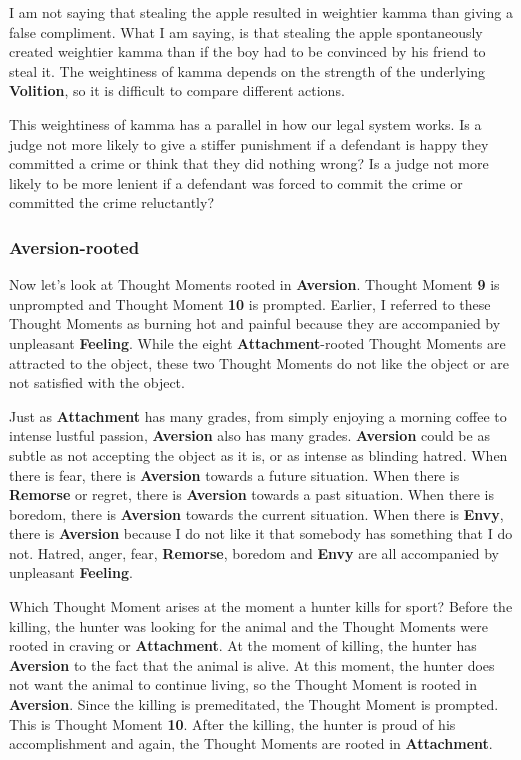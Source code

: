 I am not saying that stealing the apple resulted in weightier kamma than giving a false compliment. What I am saying, is that stealing the apple spontaneously created weightier kamma than if the boy had to be convinced by his friend to steal it. The weightiness of kamma depends on the strength of the underlying \textbf{Volition}, so it is difficult to compare different actions.

This weightiness of kamma has a parallel in how our legal system works. Is a judge not more likely to give a stiffer punishment if a defendant is happy they committed a crime or think that they did nothing wrong? Is a judge not more likely to be more lenient if a defendant was forced to commit the crime or committed the crime reluctantly?

\subsubsection*{\textbf{Aversion}-rooted}

Now let’s look at Thought Moments rooted in \textbf{Aversion}. Thought Moment \textbf{9} is unprompted and Thought Moment \textbf{10} is prompted. Earlier, I referred to these Thought Moments as burning hot and painful because they are accompanied by unpleasant \textbf{Feeling}. While the eight \textbf{Attachment}-rooted Thought Moments are attracted to the object, these two Thought Moments do not like the object or are not satisfied with the object.

Just as \textbf{Attachment} has many grades, from simply enjoying a morning coffee to intense lustful passion, \textbf{Aversion} also has many grades. \textbf{Aversion} could be as subtle as not accepting the object as it is, or as intense as blinding hatred. When there is fear, there is \textbf{Aversion} towards a future situation. When there is \textbf{Remorse} or regret, there is \textbf{Aversion} towards a past situation. When there is boredom, there is \textbf{Aversion} towards the current situation. When there is \textbf{Envy}, there is \textbf{Aversion} because I do not like it that somebody has something that I do not. Hatred, anger, fear, \textbf{Remorse}, boredom and \textbf{Envy} are all accompanied by unpleasant \textbf{Feeling}.

Which Thought Moment arises at the moment a hunter kills for sport? Before the killing, the hunter was looking for the animal and the Thought Moments were rooted in craving or \textbf{Attachment}. At the moment of killing, the hunter has \textbf{Aversion} to the fact that the animal is alive. At this moment, the hunter does not want the animal to continue living, so the Thought Moment is rooted in \textbf{Aversion}. Since the killing is premeditated, the Thought Moment is prompted. This is Thought Moment \textbf{10}. After the killing, the hunter is proud of his accomplishment and again, the Thought Moments are rooted in \textbf{Attachment}.

